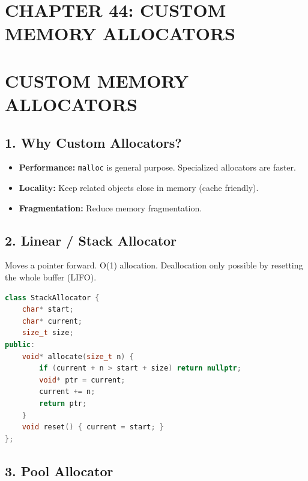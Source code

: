 \hypertarget{chapter-44-custom-memory-allocators}{%
\section{CHAPTER 44: CUSTOM MEMORY
ALLOCATORS}\label{chapter-44-custom-memory-allocators}}

\hypertarget{custom-memory-allocators}{%
\section{CUSTOM MEMORY ALLOCATORS}\label{custom-memory-allocators}}

\hypertarget{why-custom-allocators}{%
\subsection{1. Why Custom Allocators?}\label{why-custom-allocators}}

\begin{itemize}
\tightlist
\item
  \textbf{Performance:} \passthrough{\lstinline!malloc!} is general
  purpose. Specialized allocators are faster.
\item
  \textbf{Locality:} Keep related objects close in memory (cache
  friendly).
\item
  \textbf{Fragmentation:} Reduce memory fragmentation.
\end{itemize}

\hypertarget{linear-stack-allocator}{%
\subsection{2. Linear / Stack Allocator}\label{linear-stack-allocator}}

Moves a pointer forward. O(1) allocation. Deallocation only possible by
resetting the whole buffer (LIFO).

\begin{lstlisting}[language={C++}]
class StackAllocator {
    char* start;
    char* current;
    size_t size;
public:
    void* allocate(size_t n) {
        if (current + n > start + size) return nullptr;
        void* ptr = current;
        current += n;
        return ptr;
    }
    void reset() { current = start; }
};
\end{lstlisting}

\hypertarget{pool-allocator}{%
\subsection{3. Pool Allocator}\label{pool-allocator}}


